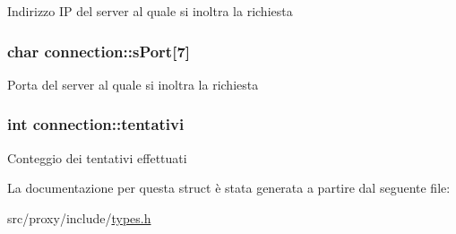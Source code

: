 \label{structconnection_a3939675d1ec7045c864a2df3bf5f8e7e}
Indirizzo IP del server al quale si inoltra la richiesta \hypertarget{structconnection_a9ee6aa71d1fe23b32954f2d6383d04a0}{
\subsubsection[{sPort}]{\setlength{\rightskip}{0pt plus 5cm}char {\bf connection::sPort}\mbox{[}7\mbox{]}}}
\label{structconnection_a9ee6aa71d1fe23b32954f2d6383d04a0}
Porta del server al quale si inoltra la richiesta \hypertarget{structconnection_a7567ce596b311e606b465e0f2fbf17b6}{
\subsubsection[{tentativi}]{\setlength{\rightskip}{0pt plus 5cm}int {\bf connection::tentativi}}}
\label{structconnection_a7567ce596b311e606b465e0f2fbf17b6}
Conteggio dei tentativi effettuati 

La documentazione per questa struct è stata generata a partire dal seguente file:\begin{DoxyCompactItemize}
\item 
src/proxy/include/\hyperlink{types_8h}{types.h}\end{DoxyCompactItemize}
